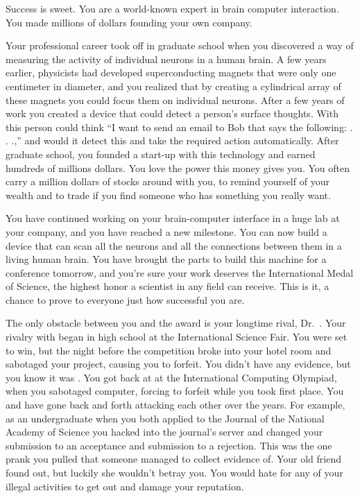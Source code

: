 \documentclass[char]{guildcamp1}
\begin{document}
\name{\cRival{}}


Success is sweet.  You are a world-known expert in brain computer interaction.  You made millions of dollars founding your own company.  

Your professional career took off in graduate school when you discovered a way of measuring the activity of individual neurons in a human brain.  A few years earlier, physicists had developed superconducting magnets that were only one centimeter in diameter, and you realized that by creating a cylindrical array of these magnets you could focus them on individual neurons.  After a few years of work you created a device that could detect a person's surface thoughts. With this person could think ``I want to send an email to Bob that says the following: . . .,'' and would it detect this and take the required action automatically.  After graduate school, you founded a start-up with this technology and earned hundreds of  millions dollars.  You love the power this money gives you.  You often carry a million dollars of stocks around with you, to remind yourself of your wealth and to trade if you find someone who has something you really want.

You have continued working on your brain-computer interface in a huge lab at your company, and you have reached a new milestone.  You can now build a device that can scan all the neurons and all the connections between them in a living human brain.  You have brought the parts to build this machine for a conference tomorrow, and you're sure your work deserves the International Medal of Science, the highest honor a scientist in any field can receive.  This is it, a chance to prove to everyone just how successful you are.

The only obstacle between you and the award is your longtime rival, Dr.~\cScientist{\intro}.  Your rivalry with \cScientist{} began in high school at the International Science Fair.  %
You were set to win, but the night before the competition \cScientist{} broke into your hotel room and sabotaged your project, causing you to forfeit.  You didn't have any evidence, but you know it was \cScientist{\them}.  You got back at \cScientist{\them} at the International Computing Olympiad, when you sabotaged \cScientist{\their} computer, forcing \cScientist{\them} to forfeit while you took first place.  You and \cScientist{} have gone back and forth attacking each other over the years.  For example, as an undergraduate when you both applied to the Journal of the National Academy of Science you hacked into the journal's server and changed your submission to an acceptance and \cScientist{\their} submission to a rejection. This was the one prank you pulled that someone managed to collect evidence of.  Your old friend \cBride{} found out, but luckily she wouldn't betray you.  You would hate for any of your illegal activities to get out and damage your reputation.
\end{document}
